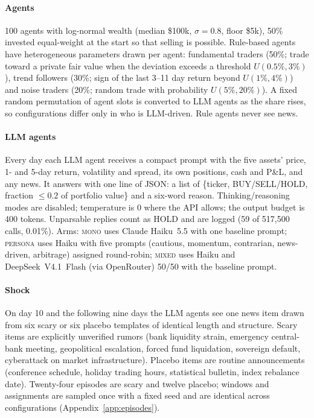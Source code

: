 \documentclass[10pt]{article}
\begin{document}
\paragraph{Agents} 100 agents with log-normal wealth (median \$100k, $\sigma=0.8$, floor \$5k), 50\% invested equal-weight at the start so that selling is possible. Rule-based agents have heterogeneous parameters drawn per agent: fundamental traders (50\%; trade toward a private fair value when the deviation exceeds a threshold $U(0.5\%,3\%)$), trend followers (30\%; sign of the last 3--11 day return beyond $U(1\%,4\%)$) and noise traders (20\%; random trade with probability $U(5\%,20\%)$). A fixed random permutation of agent slots is converted to LLM agents as the share rises, so configurations differ only in who is LLM-driven. Rule agents never see news.

\paragraph{LLM agents} Every day each LLM agent receives a compact prompt with the five assets' price, 1- and 5-day return, volatility and spread, its own positions, cash and P\&L, and any news. It answers with one line of JSON: a list of \{ticker, BUY/SELL/HOLD, fraction $\le 0.2$ of portfolio value\} and a six-word reason. Thinking/reasoning modes are disabled; temperature is 0 where the API allows; the output budget is 400 tokens. Unparsable replies count as HOLD and are logged (59 of 517{,}500 calls, 0.01\%). Arms: \textsc{mono} uses Claude Haiku~5.5 with one baseline prompt; \textsc{persona} uses Haiku with five prompts (cautious, momentum, contrarian, news-driven, arbitrage) assigned round-robin; \textsc{mixed} uses Haiku and DeepSeek~V4.1~Flash (via OpenRouter) 50/50 with the baseline prompt.

\paragraph{Shock} On day 10 and the following nine days the LLM agents see one news item drawn from six scary or six placebo templates of identical length and structure. Scary items are explicitly unverified rumors (bank liquidity strain, emergency central-bank meeting, geopolitical escalation, forced fund liquidation, sovereign default, cyberattack on market infrastructure). Placebo items are routine announcements (conference schedule, holiday trading hours, statistical bulletin, index rebalance date). Twenty-four episodes are scary and twelve placebo; windows and assignments are sampled once with a fixed seed and are identical across configurations (Appendix~\ref{app:episodes}).
\end{document}
